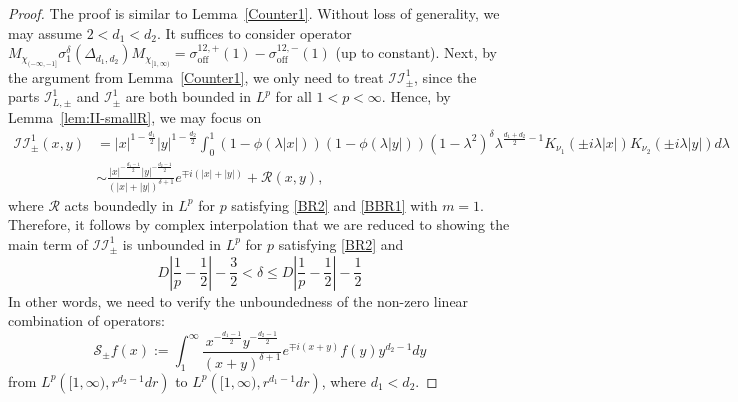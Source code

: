 \documentclass[12pt]{amsart}
\newcommand\Lapd{\Delta_{d_1, d_2}}
\begin{document}
\begin{proof}
The proof is similar to Lemma~\ref{Counter1}. Without loss of generality, we may assume $2<d_1<d_2$. It suffices to consider operator $   M_{\chi_{(-\infty,-1]}}\sigma_{1}^\delta(\Lapd) M_{\chi_{[1,\infty)}} = \sigma_{\mathrm{off}}^{12,+}(1) - \sigma_{\mathrm{off}}^{12,-}(1)$ (up to constant). Next, by the argument from Lemma~\ref{Counter1}, we only need to treat $\mathcal{II}_{\pm}^1$, since the parts $\mathcal{I}_{L,\pm}^1$ and $\mathcal{I}_{\pm}^1$ are both bounded in $L^p$ for all $1<p<\infty$. Hence, by Lemma~\ref{lem:II-smallR}, we may focus on 
\begin{align*}
    \mathcal{II}_{\pm}^1(x,y)
&= |x|^{1-\frac{d_1}{2}}|y|^{1-\frac{d_2}{2}}
\int_0^1
(1-\phi(\lambda |x|))(1-\phi(\lambda |y|))(1-\lambda^2)^\delta
\lambda^{\frac{d_1+d_2}{2}-1}
K_{\nu_1}(\pm i\lambda |x|)K_{\nu_2}(\pm i\lambda |y|) d\lambda\\
&\sim\frac{|x|^{-\frac{d_1-1}{2}} |y|^{-\frac{d_2-1}{2}}}{(|x|+|y|)^{\delta+1}} e^{\mp i(|x|+|y|)} + \mathcal{R}(x,y),
\end{align*}
where $\mathcal{R}$ acts boundedly in $L^p$ for $p$ satisfying \eqref{BR2} and \eqref{BBR1} with $m=1$. Therefore, it follows by complex interpolation that 
we are reduced to showing the main term of $\mathcal{II}_{\pm}^1$ is unbounded in $L^p$ for $p$ satisfying \eqref{BR2} and
\begin{equation*}
    D\left| \frac{1}{p} - \frac{1}{2} \right| - \frac{3}{2} < \delta \le D\left| \frac{1}{p} - \frac{1}{2} \right| - \frac{1}{2}
\end{equation*}
In other words, we need to verify the unboundedness of the non-zero linear combination of operators:
\begin{equation*}
    \mathcal{S}_{\pm}f(x) := \int_1^\infty \frac{x^{-\frac{d_1-1}{2}} y^{-\frac{d_2-1}{2}}}{(x+y)^{\delta+1}} e^{\mp i(x+y)} f(y) y^{d_2-1} dy
\end{equation*}
from $L^p\left([1,\infty), r^{d_2-1}dr\right)$ to $L^p\left([1,\infty), r^{d_1-1}dr\right)$, where $d_1<d_2$.


\end{proof}
\end{document}

